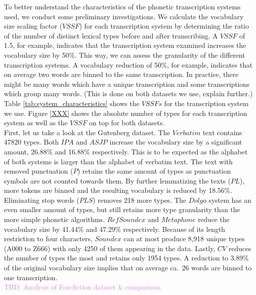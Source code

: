To better understand the characteristics of the phonetic transcription systems used, we conduct some preliminary investigations.
We calculate the vocabulary size scaling factor ($VSSF$) for each transcription system by determining the ratio of the number of distinct lexical types before and after transcribing.
A $VSSF$ of 1.5, for example, indicates that the transcription system examined increases the vocabulary size by 50\%.
This way, we can assess the granularity of the different transcription systems.
A vocabulary reduction of 50\%, for example, indicates that on average two words are binned to the same transcription.
In practice, there might be many words which have a unique transcription and some transcriptions which group many words.
(This is done on both datasets we use, explain further.)
Table \ref{tab:system_characteristics} shows the $VSSFs$ for the transcription system we use.
Figure \ref{XXX} shows the absolute number of types for each transcription system as well as the $VSSF$ on top for both datasets.\\
First, let us take a look at the Gutenberg dataset.
The $Verbatim$ text contains 47820 types.
Both $IPA$ and $ASJP$ increase the vocabulary size by a significant amount, 26.88\% and 16.88\% respectively.
This is to be expected as the alphabet of both systems is larger than the alphabet of verbatim text.
The text with removed punctuation ($P$) retains the same amount of types as punctuation symbols are not counted towards them.
By further lemmatizing the texts ($PL$), more tokens are binned and the resulting vocabulary is reduced by 18.56\%.
Eliminating stop words ($PLS$) removes 218 more types.
The $Dolgo$ system has an even smaller amount of types, but still retains more type granularity than the more simple phonetic algorithms.
$RefSoundex$ and $Metaphone$ reduce the vocabulary size by 41.44\% and 47.29\% respectively.
Because of its length restriction to four characters, $Soundex$ can at most produce 8,918 unique types (A000 to Z666) with only 4250 of them appearing in the data.
Lastly, $CV$ reduces the number of types the most and retains only 1954 types.
A reduction to 3.89\% of the original vocabulary size implies that on average ca.\ 26 words are binned to one transcription.\\
\textcolor{violet}{TBD: Analysis of Fan-fiction dataset & comparison.}


